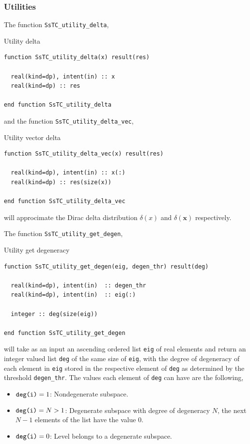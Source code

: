 \documentclass[10pt,a4paper]{article}
\begin{document}
\subsubsection{Utilities}
The function \verb|SsTC_utility_delta|,
\begin{codebox}{Utility delta}
\begin{lstlisting}[caption={Interface of ``utility delta".},captionpos=b]
function SsTC_utility_delta(x) result(res)

  real(kind=dp), intent(in) :: x
  real(kind=dp) :: res

end function SsTC_utility_delta
\end{lstlisting}
\end{codebox}
and the function \verb|SsTC_utility_delta_vec|,
\begin{codebox}{Utility vector delta}
\begin{lstlisting}[caption={Interface of ``utility delta vector".},captionpos=b]
function SsTC_utility_delta_vec(x) result(res)

  real(kind=dp), intent(in) :: x(:)
  real(kind=dp) :: res(size(x))

end function SsTC_utility_delta_vec
\end{lstlisting}
\end{codebox}
will approcimate the Dirac delta distribution $\delta(x)$ and $\delta(\bm{x})$ respectively.

The function \verb|SsTC_utility_get_degen|,
\begin{codebox}{Utility get degeneracy}
\begin{lstlisting}[caption={Interface of ``utility get degeneracy of lists".},captionpos=b]
function SsTC_utility_get_degen(eig, degen_thr) result(deg)

  real(kind=dp), intent(in)  :: degen_thr
  real(kind=dp), intent(in)  :: eig(:)

  integer :: deg(size(eig))

end function SsTC_utility_get_degen
\end{lstlisting}
\end{codebox}
will take as an input an ascending ordered list \verb|eig| of real elements and return an integer valued list \verb|deg| of the same size of \verb|eig|, with the degree of degeneracy of each element in \verb|eig| stored in the respective element of \verb|deg| as determined by the threshold \verb|degen_thr|. The values each element of \verb|deg| can have are the following,
\begin{tcolorbox}
\begin{itemize}
\item $\verb|deg(i)| = 1$: Nondegenerate subspace.
\item $\verb|deg(i)| = N>1$: Degenerate subspace with degree of degeneracy $N$, the next $N-1$ elements of the list have the value $0$.
\item $\verb|deg(i)| = 0$: Level belongs to a degenerate subspace.
\end{itemize}
\end{tcolorbox}
\end{document}
